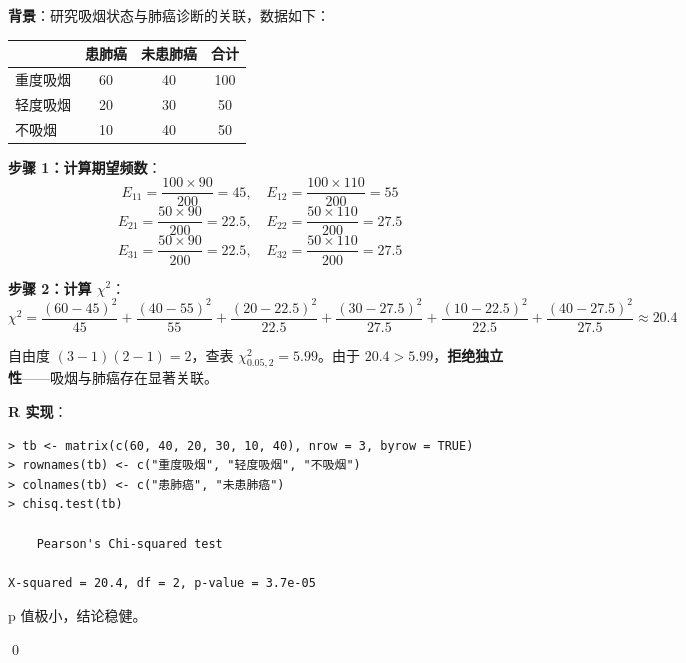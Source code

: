 \begin{Example}\label{ex:smoking-lung-cancer}
\textbf{背景}：研究吸烟状态与肺癌诊断的关联，数据如下：

\begin{center}
\begin{tabular}{lccc}
\hline
        & 患肺癌 & 未患肺癌 & 合计\\\hline
重度吸烟 & 60 & 40 & 100\\
轻度吸烟 & 20 & 30 & 50\\
不吸烟   & 10 & 40 & 50\\\hline
\end{tabular}
\end{center}

\textbf{步骤 1：计算期望频数}：
\[
E_{11} = \frac{100 \times 90}{200} = 45, \quad
E_{12} = \frac{100 \times 110}{200} = 55
\]
\[
E_{21} = \frac{50 \times 90}{200} = 22.5, \quad
E_{22} = \frac{50 \times 110}{200} = 27.5
\]
\[
E_{31} = \frac{50 \times 90}{200} = 22.5, \quad
E_{32} = \frac{50 \times 110}{200} = 27.5
\]

\textbf{步骤 2：计算 $\chi^2$}：
\[
\chi^2 = \frac{(60-45)^2}{45} + \frac{(40-55)^2}{55} + \frac{(20-22.5)^2}{22.5} + \frac{(30-27.5)^2}{27.5} + \frac{(10-22.5)^2}{22.5} + \frac{(40-27.5)^2}{27.5} \approx 20.4
\]

自由度 $(3-1)(2-1) = 2$，查表 $\chi^2_{0.05,2} = 5.99$。由于 $20.4 > 5.99$，\textbf{拒绝独立性}——吸烟与肺癌存在显著关联。

\textbf{R 实现}：
\begin{verbatim}
> tb <- matrix(c(60, 40, 20, 30, 10, 40), nrow = 3, byrow = TRUE)
> rownames(tb) <- c("重度吸烟", "轻度吸烟", "不吸烟")
> colnames(tb) <- c("患肺癌", "未患肺癌")
> chisq.test(tb)

    Pearson's Chi-squared test

X-squared = 20.4, df = 2, p-value = 3.7e-05
\end{verbatim}

p 值极小，结论稳健。

\qed
\end{Example}


